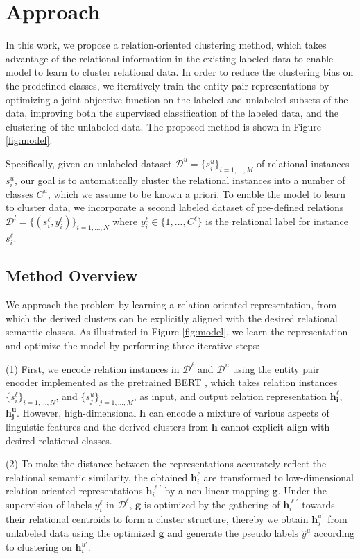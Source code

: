 \documentclass[11pt]{article}
\begin{document}
\section{Approach}
    In this work, we propose a relation-oriented clustering method, which takes advantage of the relational information in the existing labeled data to enable model to learn to cluster relational data. In order to reduce the clustering bias on the predefined classes, we iteratively train the entity pair representations by optimizing a joint objective function on the labeled and unlabeled subsets of the data, improving both the supervised classification of the labeled data, and the clustering of the unlabeled data. The proposed method is shown in Figure \ref{fig:model}.
    
    Specifically, given an unlabeled dataset $\mathcal{D}^u=\{s_i^u\}_{i=1,...,M}$ of relational instances $s_i^u$, our goal is to automatically cluster the relational instances into a number of classes $C^u$, which we assume to be known a priori. To enable the model to learn to cluster data, we incorporate a second labeled dataset of pre-defined relations $\mathcal{D}^l=\{(s_i^\ell,y_i^\ell)\}_{i=1,...,N}$ where $y_i^\ell\in \{1,...,C^\ell\}$ is the relational label for instance $s_i^\ell$.
    \subsection{Method Overview}
        We approach the problem by learning a relation-oriented representation, from which the derived clusters can be explicitly aligned with the desired relational semantic classes.
As illustrated in Figure \ref{fig:model}, we learn the representation and optimize the model by performing three iterative steps:

        \noindent(1) First, we encode relation instances in $\mathcal{D}^\ell$ and $\mathcal{D}^u$ using the entity pair encoder implemented as the pretrained BERT \citep{DBLP:journals/corr/abs-1810-04805}, which takes relation instances $\{s_i^\ell\}_{i=1,...,N}$, and $\{s_j^u\}_{j=1,...,M}$, as input, and output relation representation $\bm{h_i^\ell}$, $\bm{h_j^u}$. However, high-dimensional $\bm{h}$ can encode a mixture of various aspects of linguistic features and the derived clusters from $\bm{h}$ cannot explicit align with desired relational classes. 

        \noindent(2) To make the distance between the representations accurately reflect the relational semantic similarity, the obtained $\bm{h}_i^\ell$ are transformed to low-dimensional relation-oriented representations $\bm{h}_i^{\ell\prime}$ by a non-linear mapping $\bm{g}$. Under the supervision of labels $y_i^\ell$ in $\mathcal{D}^\ell$, $\bm{g}$ is optimized by the gathering of $\bm{h}_i^{\ell\prime}$ towards their relational centroids to form a cluster structure, thereby we obtain $\bm{h}_j^{u\prime}$ from unlabeled data using the optimized $\bm{g}$ and generate the pseudo labels $\hat{y}^u$ according to clustering on $\bm{h}_i^{u\prime}$. 
\end{document}
